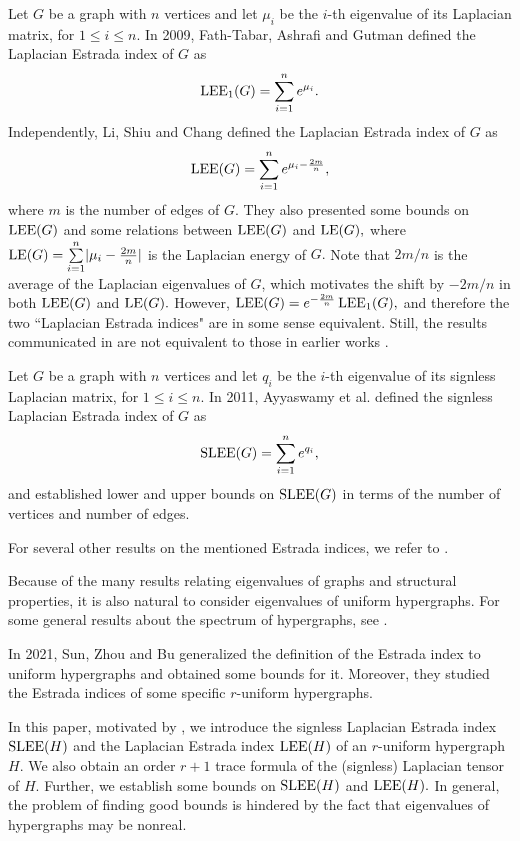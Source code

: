 \documentclass[11pt]{article}
\def\LEE{\mathop{\rm LEE }\nolimits}
\def\LE{\mathop{\rm LE }\nolimits}
\def\SLEE{\mathop{\rm SLEE }\nolimits}
\begin{document}
Let $G$ be a graph with $n$ vertices
and let $\mu_{i}$ be the $i$-th eigenvalue of its Laplacian matrix, for $1 \leq i \leq n.$ In 2009, Fath-Tabar, Ashrafi and Gutman \cite{FAG} defined the Laplacian Estrada index of $G$ as
$$\LEE_{1}(G)=\sum\limits_{i=1}^{n}e^{\mu_{i}}.$$
Independently, Li, Shiu and Chang \cite{LSC} defined the Laplacian Estrada index of $G$ as $$\LEE(G)=\sum\limits_{i=1}^{n}e^{\mu_{i}-\frac{2m}{n}},$$ where $m$ is the number of edges of $G$.
They also presented some bounds on $\LEE(G)$ and some relations between $\LEE(G)$ and $\LE(G),$ where $\LE(G)=\sum\limits_{i=1}^{n}\lvert \mu_{i}-\frac{2m}{n}\rvert$ is the Laplacian energy of $G.$
Note that $2m/n$ is the average of the Laplacian eigenvalues of $G$, which motivates the shift by $-2m/n$ in both $\LEE(G)$ and $\LE(G).$
However, $\LEE(G)=e^{-\frac{2m}{n}}\LEE_{1}(G),$ and therefore the two ``Laplacian Estrada indices" are in some sense equivalent. Still, the results communicated in \cite{LSC} are not equivalent to those in earlier works \cite{FAG,Z1,ZG}.

Let $G$ be a graph with $n$ vertices
and let $q_{i}$ be the $i$-th eigenvalue of its signless Laplacian matrix, for $1 \leq i \leq n.$ In 2011,  Ayyaswamy et al. \cite{ABVG} defined the signless Laplacian Estrada index of $G$ as $$\SLEE(G)=\sum\limits_{i=1}^{n}e^{q_{i}},$$
and established lower and upper bounds on $\SLEE(G)$ in terms of the number of vertices and number of edges.

For several other results on the mentioned Estrada indices, we refer to \cite{CH, DZ,DL,K}.

Because of the many results relating eigenvalues of graphs and structural properties, it is also natural to consider eigenvalues of uniform hypergraphs. For some general results about the spectrum of hypergraphs, see \cite{BFWZ,DW,DWL,Qi2,SQH}.

In 2021, Sun, Zhou and Bu \cite{SZB} generalized the definition of the Estrada index to uniform hypergraphs and obtained some bounds for it. Moreover, they studied the Estrada indices of some specific $r$-uniform hypergraphs.

In this paper, motivated by \cite{LSC,SZB}, we introduce the signless Laplacian Estrada index $\SLEE(H)$ and the Laplacian Estrada index $\LEE(H)$ of an $r$-uniform hypergraph $H.$ We also obtain an order $r+1$ trace formula of the (signless) Laplacian tensor of $H.$ Further, we establish some bounds on $\SLEE(H)$ and $\LEE(H).$ In general, the problem of finding good bounds is hindered by the fact that eigenvalues of hypergraphs may be nonreal.
\end{document}

